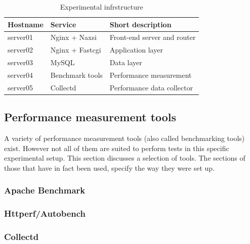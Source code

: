 \documentclass[Methods]{subfiles}
\begin{document}
\begin{table}[H]
\caption{Experimental infrstructure}
\begin{tabular}{|p{}|p{}|p{5cm}|}
\hline
\textbf{Hostname} & \textbf{Service} & \textbf{Short description} \\ \hline
server01 & Nginx + Naxsi & Front-end server and router \\ \hline
server02 & Nginx + Fastcgi & Application layer \\ \hline
server03 & MySQL & Data layer \\ \hline
server04 & Benchmark tools & Performance measurement \\ \hline
server05 & Collectd & Performance data collector \\ \hline
\end{tabular}
\label{tab:Experimental infrastructure}
\end{table}

\subsection{Performance measurement tools}
A variety of performance measurement tools (also called benchmarking tools) exist. However not all of them are suited to perform tests in this specific experimental setup. This section discusses a selection of tools. The sections of those that have in fact been used, specify the way they were set up.

\subsubsection{Apache Benchmark}


\subsubsection{Httperf/Autobench}


\subsubsection{Collectd}

\end{document}
